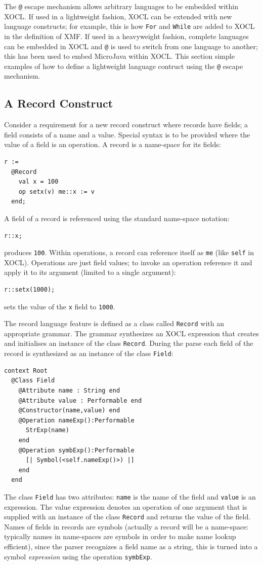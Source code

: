 \documentclass{article}
\begin{document}
The {\tt @} escape mechanism allows arbitrary languages to be embedded within
XOCL. If used in a lightweight fashion, XOCL can be extended with new language
constructs; for example, this is how {\tt For} and {\tt While} are added to XOCL
in the definition of XMF. If used in a heavyweight fashion, complete languages
can be embedded in XOCL and {\tt @} is used to switch from one language to another;
this has been used to embed MicroJava within XOCL. This section simple examples of 
how to define a lightweight language contruct using the {\tt @} escape mechanism. 

\subsection{A Record Construct}

Consider a requirement for a new record construct
where records have fields; a field consists of a name and a value. Special syntax
is to be provided where the value of a field is an operation. A record is a name-space
for its fields:
\begin{verbatim}
r := 
  @Record
    val x = 100
    op setx(v) me::x := v
  end;
\end{verbatim}
A field of a record is referenced using the standard name-space notation:
\begin{verbatim}
r::x;
\end{verbatim}
produces {\tt 100}. Within operations, a record can reference itself as {\tt me}
(like {\tt self} in XOCL). Operations are just field values; to invoke an
operation reference it and apply it to its argument (limited to a single argument):
\begin{verbatim}
r::setx(1000);
\end{verbatim}
sets the value of the {\tt x} field to {\tt 1000}.

The record language feature is defined as a class called {\tt Record} with an 
appropriate grammar. The grammar synthesizes an XOCL expression that creates
and initialises an instance of the class {\tt Record}. During the parse each
field of the record is synthesized as an instance of the class {\tt Field}:
\begin{verbatim}
context Root
  @Class Field 
    @Attribute name : String end
    @Attribute value : Performable end
    @Constructor(name,value) end
    @Operation nameExp():Performable
      StrExp(name)
    end
    @Operation symbExp():Performable
      [| Symbol(<self.nameExp()>) |]
    end
  end
\end{verbatim}
The class {\tt Field} has two attributes: {\tt name} is the name of the field
and {\tt value} is an expression. The value expression denotes an operation
of one argument that is supplied with an instance of the class {\tt Record}
and returns the value of the field. Names of fields in records are symbols
(actually a record will be a name-space: typically names in name-spaces
are symbols in order to make name lookup efficient), since the parser recognizes
a field name as a string, this is turned into a symbol {\em expression} using
the operation {\tt symbExp}.
\end{document}
